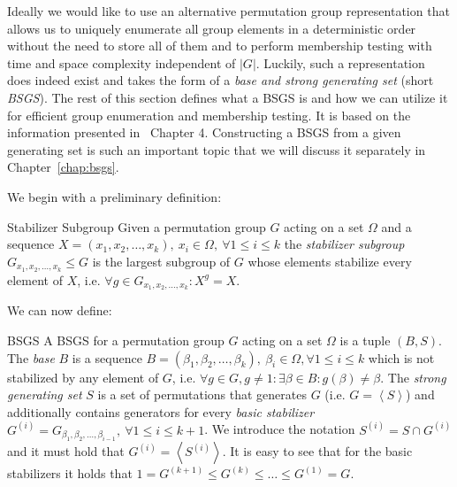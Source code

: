 Ideally we would like to use an alternative permutation group representation
that allows us to uniquely enumerate all group elements in a deterministic
order without the need to store all of them and to perform membership testing
with time and space complexity independent of $|G|$.  Luckily, such a
representation does indeed exist and takes the form of a \textit{base and
strong generating set} (short \textit{BSGS}).  The rest of this section defines
what a BSGS is and how we can utilize it for efficient group enumeration and
membership testing. It is based on the information presented in~\cite{Holt}
Chapter 4. Constructing a BSGS from a given generating set is such an important
topic that we will discuss it separately in
Chapter~\ref{chap:bsgs}.

We begin with a preliminary definition:

\begin{defn}{Stabilizer Subgroup}{}
  Given a permutation group $G$ acting on a set $\Omega$ and a sequence $X =
  (x_1, x_2, \dots, x_k),\ x_i \in \Omega,\ \forall 1 \leq i \leq k$ the
  \textit{stabilizer subgroup} $G_{x_1, x_2, \dots, x_k} \leq G$ is the largest
  subgroup of $G$ whose elements stabilize every element of $X$, i.e.
  $\forall g \in G_{x_1, x_2, \dots, x_k}: X^g = X$.
\end{defn}
%
We can now define:

\begin{defn}[label=defn:bsgs]{BSGS}{}
  A BSGS for a permutation group $G$ acting on a set $\Omega$ is a tuple $(B,
  S)$. The \textit{base} $B$ is a sequence $B = (\beta_1, \beta_2, \dots,
  \beta_k),\ \beta_i \in \Omega, \forall 1 \leq i \leq k$ which is not stabilized
  by any element of $G$, i.e.  $\forall g \in G, g \ne 1: \exists \beta \in B:
  g(\beta) \ne \beta$. The \textit{strong generating set} $S$ is a set of
  permutations that generates $G$ (i.e. $G = \left<S\right>$) and additionally
  contains generators for every \textit{basic stabilizer} $G^{(i)} = G_{\beta_1,
  \beta_2, \dots, \beta_{i-1}},\ \forall 1 \leq i \leq k + 1$. We introduce the
  notation $S^{(i)} = S \cap G^{(i)}$ and it must hold that $G^{(i)} =
  \left<S^{(i)}\right>$. It is easy to see that for the basic stabilizers it
  holds that $1 = G^{(k+1)} \leq G^{(k)} \leq \dots \leq G^{(1)} = G$.
\end{defn}

